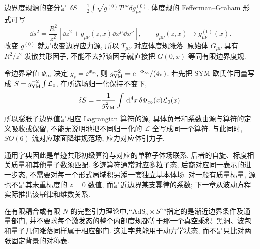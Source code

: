 边界度规源的变分是 $\delta S=\tfrac12\int\sqrt{g^{(0)}}T^{\mu\nu}\delta g^{(0)}_{\mu\nu}$. 体度规的 Fefferman--Graham 形式可写
\[
\dd s^2=\frac{R^2}{z^2}
[\dd z^2+g_{\mu\nu}(z,x)\dd x^\mu\dd x^\nu],
\qquad g_{\mu\nu}(z,x)\to g^{(0)}_{\mu\nu}(x).
\]
改变 $g^{(0)}$ 就是改变边界应力源, 所以 $T_{\mu\nu}$ 对应体度规涨落. 原始体 $G_{\mu\nu}$ 具有 $R^2/z^2$ 发散共形因子, 不能不去掉该因子就直接把 $G(0,x)$ 等同有限边界度规.

令边界常值 $\Phi_\infty$ 决定 $g_s=\ee^{\Phi_\infty}$, 则 $g_{\rm YM}^{-2}=\mathrm e^{-\Phi_\infty}/(4\pi)$. 若先把 SYM 欧氏作用量写成 $S=g_{\rm YM}^{-2}\int\mathcal L_0$, 在所选场归一化保持不变下,
\[
\delta S=-\frac1{g_{\rm YM}^2}
\int\,\mathrm d^4x\,\delta\Phi_\infty(x)\mathcal L_0(x).
\]
所以膨胀子边界值是相应 Lagrangian 算符的源, 具体负号和系数由源与算符的定义吸收或保留, 不能无说明地把不同归一化的 $\mathcal L$ 全写成同一个算符. 与此同时, $SO(6)$ 流对应球面降维规范场, 应力对应体引力子.

通用字典因此是单迹共形初级算符与对应的单粒子体场联系, 后者的自旋、标度相关质量和其他量子数须匹配. 多迹算符通常对应多粒子态, 后裔对应同一表示的进一步态, 不需要对每一个形式局域积另添一套独立基本体场. 对一般有质量标量, 源也不是其未重标度的 $z=0$ 数值, 而是近边界某支幂律的系数; 下一章从波动方程实际推出该幂律和维数关系.

在有限耦合或有限 $N$ 的完整引力理论中,“$\mathrm{AdS}_5\times S^5$”指定的是渐近边界条件及通量部门, 并不要求每个激发态的整个内部度规都等于那一个真空乘积. 黑洞、波包和量子几何涨落同样属于相应部门. 这让字典能用于动力学状态, 而不是只比对两张固定背景的对称表.
